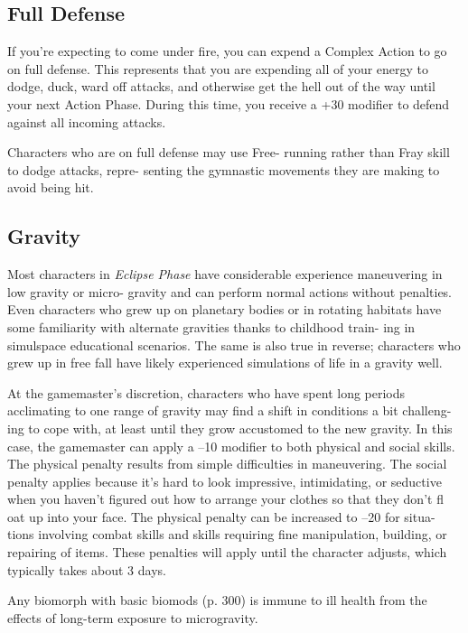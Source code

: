 \subsection{Full Defense}

If you're expecting to come under fire, you can 
expend a Complex Action to go on full defense. This 
represents that you are expending all of your energy 
to dodge, duck, ward off attacks, and otherwise get 
the hell out of the way until your next Action Phase. 
During this time, you receive a +30 modifier to defend 
against all incoming attacks.

Characters who are on full defense may use Free-
running rather than Fray skill to dodge attacks, repre-
senting the gymnastic movements they are making to 
avoid being hit.

\subsection{Gravity}

Most characters in \textit{Eclipse Phase} have considerable 
experience maneuvering in low gravity or micro-
gravity and can perform normal actions without 
penalties. Even characters who grew up on planetary 
bodies or in rotating habitats have some familiarity 
with alternate gravities thanks to childhood train-
ing in simulspace educational scenarios. The same is 
also true in reverse; characters who grew up in free 
fall have likely experienced simulations of life in a 
gravity well.

At the gamemaster's discretion, characters who 
have spent long periods acclimating to one range of 
gravity may find a shift in conditions a bit challeng-
ing to cope with, at least until they grow accustomed 
to the new gravity. In this case, the gamemaster can 
apply a –10 modifier to both physical and social skills. 
The physical penalty results from simple difficulties 
in maneuvering. The social penalty applies because 
it's hard to look impressive, intimidating, or seductive 
when you haven't figured out how to arrange your 
clothes so that they don't fl oat up into your face. The 
physical penalty can be increased to –20 for situa-
tions involving combat skills and skills requiring fine 
manipulation, building, or repairing of items. These 
penalties will apply until the character adjusts, which 
typically takes about 3 days.

Any biomorph with basic biomods (p. 300) is 
immune to ill health from the effects of long-term 
exposure to microgravity.

